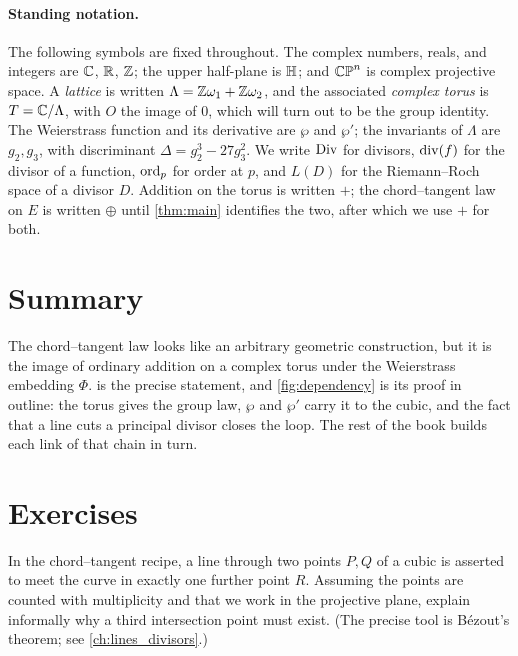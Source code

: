 \paragraph{Standing notation.}
The following symbols are fixed throughout. The complex numbers, reals, and
integers are \(\mathbb{C}\), \(\mathbb{R}\), \(\mathbb{Z}\); the upper half-plane is \(\mathbb{H}\); and
\(\mathbb{CP}^n\) is complex projective space. A \emph{lattice} is written
\(\Lambda = \mathbb{Z}\omega_1 + \mathbb{Z}\omega_2\), and the associated \emph{complex torus}
is \(T = \mathbb{C}/\Lambda\), with \(O\) the image of \(0\), which will turn out to be
the group identity. The Weierstrass function and its derivative are \(\wp\) and
\(\wp'\); the invariants of \(\Lambda\) are \(g_2, g_3\), with discriminant
\(\Delta = g_2^3 - 27 g_3^2\). We write \(\operatorname{Div}\) for divisors, \(\operatorname{div}(f)\)
for the divisor of a function, \(\operatorname{ord}_p\) for order at \(p\), and \(L(D)\) for
the Riemann--Roch space of a divisor \(D\). Addition on the torus is written
\(+\); the chord--tangent law on \(E\) is written \(\oplus\) until
\cref{thm:main} identifies the two, after which we use \(+\) for both.

\section{Summary}
\label{sec:intro-summary}

The chord--tangent law looks like an arbitrary geometric construction, but it is
the image of ordinary addition on a complex torus under the Weierstrass
embedding \(\Phi\).  is the precise statement, and
\cref{fig:dependency} is its proof in outline: the torus gives the group law,
\(\wp\) and \(\wp'\) carry it to the cubic, and the fact that a line cuts a
principal divisor closes the loop. The rest of the book builds each link of that
chain in turn.

\section*{Exercises}

\begin{exercise}
\label{ex:intro-thirdpoint}
In the chord--tangent recipe, a line through two points \(P, Q\) of a cubic is
asserted to meet the curve in exactly one further point \(R\). Assuming the
points are counted with multiplicity and that we work in the projective plane,
explain informally why a third intersection point must exist. (The precise tool
is B\'ezout's theorem; see \cref{ch:lines_divisors}.)
\end{exercise}

